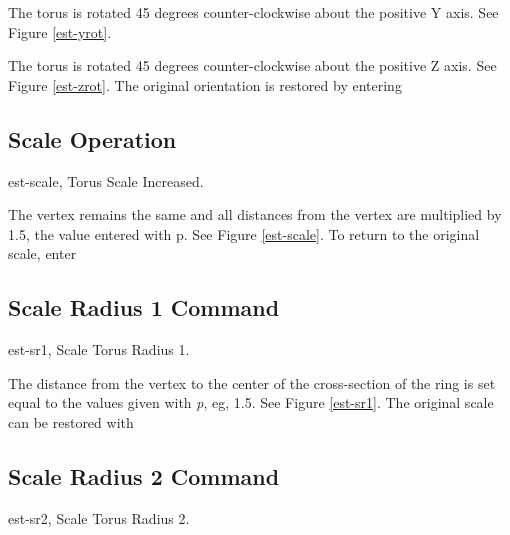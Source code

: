 
The torus is rotated 45 degrees counter-clockwise about the positive Y axis.
See Figure \ref{est-yrot}.


The torus is rotated 45 degrees counter-clockwise about the positive Z axis.
See Figure \ref{est-zrot}.
The original orientation is restored by entering


\subsection{Scale Operation}
\mfig est-scale, Torus Scale Increased.


The vertex remains the same and all distances from the vertex are
multiplied by 1.5, the value entered with p.  See Figure \ref{est-scale}.
To return to the original scale, enter


\subsection{Scale Radius 1 Command}
\mfig est-sr1, Scale Torus Radius 1.


The distance from the vertex to the center of the cross-section of the
ring is set equal to the values given with {\em p}, eg, 1.5.
See Figure \ref{est-sr1}.
The original scale can be restored with


\subsection{Scale Radius 2 Command}
\mfig est-sr2, Scale Torus Radius 2.

